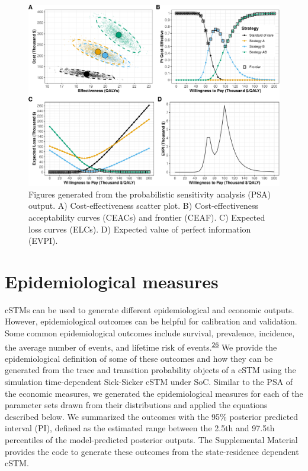 \documentclass[
]{article}
\begin{document}
\begin{figure}[H]

{\centering \includegraphics{figs/PSA-figures-1} 

}

\caption{Figures generated from the probabilistic sensitivity analysis (PSA) output. A) Cost-effectiveness scatter plot. B) Cost-effectiveness acceptability curves (CEACs) and frontier (CEAF). C) Expected loss curves (ELCs). D) Expected value of perfect information (EVPI).}\label{fig:PSA-figures}
\end{figure}

\hypertarget{epidemiological-measures}{%
\section{Epidemiological measures}\label{epidemiological-measures}}

cSTMs can be used to generate different epidemiological and economic outputs. However, epidemiological outcomes can be helpful for calibration and validation. Some common epidemiological outcomes include survival, prevalence, incidence, the average number of events, and lifetime risk of events.\textsuperscript{\protect\hyperlink{ref-Siebert2012c}{26}} We provide the epidemiological definition of some of these outcomes and how they can be generated from the trace and transition probability objects of a cSTM using the simulation time-dependent Sick-Sicker cSTM under SoC. Similar to the PSA of the economic measures, we generated the epidemiological measures for each of the parameter sets drawn from their distributions and applied the equations described below. We summarized the outcomes with the 95\% posterior predicted interval (PI), defined as the estimated range between the 2.5th and 97.5th percentiles of the model-predicted posterior outputs. The Supplemental Material provides the code to generate these outcomes from the state-residence dependent cSTM.
\end{document}
